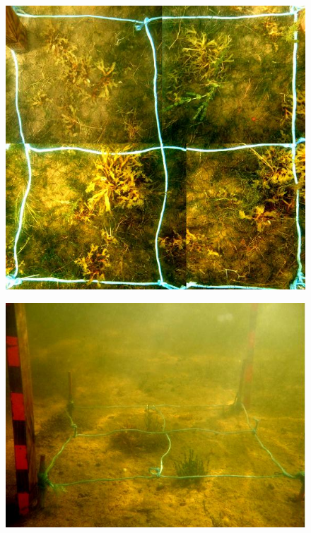 \documentclass[xcolor=dvipsnames]{beamer}
\begin{document}
\begin{frame}
\begin{columns}
\begin{column}{5.5cm}
\begin{overprint}
\begin{figure}
\includegraphics[height=0.55\textheight]{images/Fotos/griebenvonoben.jpg}
\end{figure}
\begin{figure}
\includegraphics[width=\textwidth]{images/plotpictures/Bsp_G-M}
\end{figure}
\end{overprint}
\end{column}
\end{columns}
\end{frame}
\end{document}
